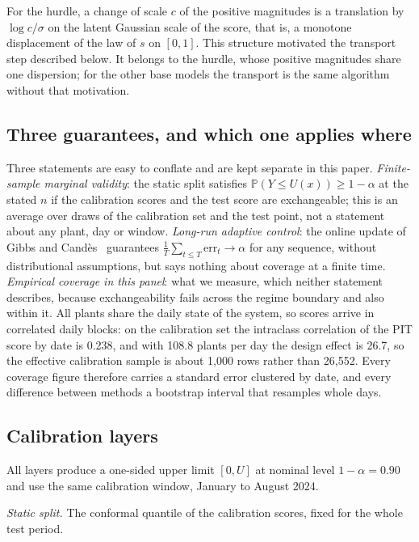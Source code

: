 For the hurdle, a change of scale $c$ of the positive magnitudes is a translation by $\log c/\sigma$ on the latent Gaussian scale of the score, that is, a monotone displacement of the law of $s$ on $[0,1]$. This structure motivated the transport step described below. It belongs to the hurdle, whose positive magnitudes share one dispersion; for the other base models the transport is the same algorithm without that motivation.

\subsection{Three guarantees, and which one applies where}
\label{sec:guarantees}

Three statements are easy to conflate and are kept separate in this paper. \emph{Finite-sample marginal validity}: the static split satisfies $\mathbb{P}(Y\le U(x))\ge 1-\alpha$ at the stated $n$ if the calibration scores and the test score are exchangeable; this is an average over draws of the calibration set and the test point, not a statement about any plant, day or window. \emph{Long-run adaptive control}: the online update of Gibbs and Cand\`es~\cite{gibbs2021} guarantees $\frac1T\sum_{t\le T}\mathrm{err}_t\to\alpha$ for any sequence, without distributional assumptions, but says nothing about coverage at a finite time. \emph{Empirical coverage in this panel}: what we measure, which neither statement describes, because exchangeability fails across the regime boundary and also within it. All plants share the daily state of the system, so scores arrive in correlated daily blocks: on the calibration set the intraclass correlation of the PIT score by date is 0.238, and with 108.8 plants per day the design effect is 26.7, so the effective calibration sample is about 1{,}000 rows rather than 26{,}552. Every coverage figure therefore carries a standard error clustered by date, and every difference between methods a bootstrap interval that resamples whole days.

\subsection{Calibration layers}
\label{sec:respuestas}

All layers produce a one-sided upper limit $[0,U]$ at nominal level $1-\alpha=0.90$ and use the same calibration window, January to August 2024.

\emph{Static split.} The conformal quantile of the calibration scores, fixed for the whole test period.

